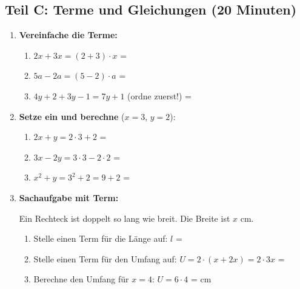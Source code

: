 \subsection*{Teil C: Terme und Gleichungen (20 Minuten)}

\begin{enumerate}[resume, label=\arabic*.]
    \item \textbf{Vereinfache die Terme:}

    \begin{enumerate}[label=\alph*)]
        \item $2x + 3x = (2 + 3) \cdot x$ = \underline{\hspace{3cm}}
        \item $5a - 2a = (5 - 2) \cdot a$ = \underline{\hspace{3cm}}
        \item $4y + 2 + 3y - 1 = 7y + 1$ (ordne zuerst!) = \underline{\hspace{3cm}}
    \end{enumerate}

    \vspace{0.5cm}

    \item \textbf{Setze ein und berechne} ($x = 3$, $y = 2$):

    \begin{enumerate}[label=\alph*)]
        \item $2x + y = 2 \cdot 3 + 2$ = \underline{\hspace{3cm}}
        \item $3x - 2y = 3 \cdot 3 - 2 \cdot 2$ = \underline{\hspace{3cm}}
        \item $x^2 + y = 3^2 + 2 = 9 + 2$ = \underline{\hspace{3cm}}
    \end{enumerate}

    \vspace{0.5cm}

    \item \textbf{Sachaufgabe mit Term:}

    Ein Rechteck ist doppelt so lang wie breit. Die Breite ist $x$ cm.

    \begin{enumerate}[label=\alph*)]
        \item Stelle einen Term für die Länge auf: $l$ = \underline{\hspace{3cm}}
        \item Stelle einen Term für den Umfang auf: 
        $U = 2 \cdot (x + 2x) = 2 \cdot 3x$ = \underline{\hspace{3cm}}
        \item Berechne den Umfang für $x = 4$: 
        $U = 6 \cdot 4$ = \underline{\hspace{3cm}} cm
    \end{enumerate}
\end{enumerate}